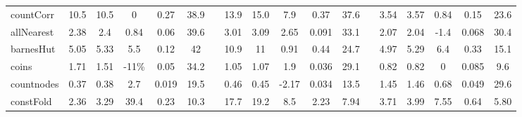 \begin{tabular}{@{}l ccccc r ccccc r ccccc@{}}
    countCorr & 10.5 & 10.5 & 0 & 0.27 & 38.9  && 13.9 & 15.0 & 7.9 & 0.37 & 37.6 && 3.54 & 3.57 & 0.84 & 0.15 & 23.6 \\

    allNearest & 2.38 & 2.4 & 0.84 & 0.06 & 39.6 && 3.01 & 3.09 & 2.65 & 0.091 & 33.1 && 2.07  & 2.04 & -1.4 & 0.068 & 30.4  \\


    barnesHut & 5.05  & 5.33 & 5.5 & 0.12 & 42 && 10.9 & 11 & 0.91 & 0.44 & 24.7 && 4.97 & 5.29 & 6.4 & 0.33 & 15.1  \\



    coins & 1.71 & 1.51  & -11\% & 0.05 & 34.2 && 1.05  & 1.07  & 1.9  & 0.036  & 29.1  && 0.82 & 0.82 & 0  & 0.085  & 9.6  \\

    countnodes & 0.37  & 0.38  & 2.7 & 0.019 & 19.5  && 0.46 & 0.45  & -2.17  & 0.034 & 13.5  && 1.45 & 1.46 & 0.68  & 0.049 & 29.6  \\

    constFold & 2.36  & 3.29  & 39.4 & 0.23 & 10.3 && 17.7 & 19.2 & 8.5 & 2.23 & 7.94 && 3.71 & 3.99 & 7.55 & 0.64 & 5.80 \\

    


\end{tabular}
